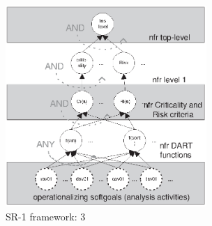 \documentclass[twocolumn]{styles/IEEEtran}
\begin{document}
\begin{figure}[h]
\begin{center}
\includegraphics[width=3in]{fig/and3any.eps}

\end{center}
\caption{SR-1 framework: 3}
\label{fig:cara_analysis_and3any}
\end{figure}
\end{document}
